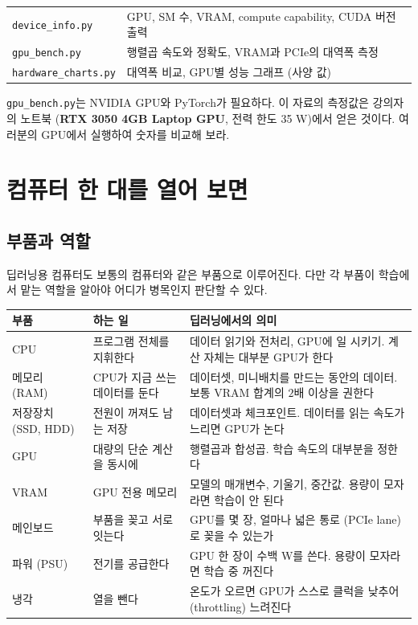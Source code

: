 \documentclass[11pt,a4paper]{article}
\begin{document}
\begin{remarkbox}
\begin{tabular}{@{}ll@{}}
\texttt{device\_info.py} & GPU, SM 수, VRAM, compute capability, CUDA 버전 출력 \\
\texttt{gpu\_bench.py} & 행렬곱 속도와 정확도, VRAM과 PCIe의 대역폭 측정 \\
\texttt{hardware\_charts.py} & 대역폭 비교, GPU별 성능 그래프 (사양 값) \\
\end{tabular}
\medskip

\texttt{gpu\_bench.py}는 NVIDIA GPU와 PyTorch가 필요하다.
이 자료의 측정값은 강의자의 노트북 (\textbf{RTX 3050 4GB Laptop GPU}, 전력 한도 35 W)에서 얻은 것이다.
여러분의 GPU에서 실행하여 숫자를 비교해 보라.
\end{remarkbox}

\section{컴퓨터 한 대를 열어 보면}\label{sec:parts}

\subsection{부품과 역할}\label{sec:parts_roles}

딥러닝용 컴퓨터도 보통의 컴퓨터와 같은 부품으로 이루어진다. 다만 각 부품이 학습에서 맡는 역할을 알아야 어디가 병목인지 판단할 수 있다.

\begin{center}
{\small
\begin{tabular}{@{}>{\raggedright\arraybackslash}p{30mm}>{\raggedright\arraybackslash}p{52mm}>{\raggedright\arraybackslash}p{68mm}@{}}
\toprule
부품 & 하는 일 & 딥러닝에서의 의미 \\
\midrule
CPU & 프로그램 전체를 지휘한다 & 데이터 읽기와 전처리, GPU에 일 시키기. 계산 자체는 대부분 GPU가 한다 \\
메모리 (RAM) & CPU가 지금 쓰는 데이터를 둔다 & 데이터셋, 미니배치를 만드는 동안의 데이터. 보통 VRAM 합계의 $2$배 이상을 권한다 \\
저장장치 (SSD, HDD) & 전원이 꺼져도 남는 저장 & 데이터셋과 체크포인트. 데이터를 읽는 속도가 느리면 GPU가 논다 \\
GPU & 대량의 단순 계산을 동시에 & 행렬곱과 합성곱. 학습 속도의 대부분을 정한다 \\
VRAM & GPU 전용 메모리 & 모델의 매개변수, 기울기, 중간값. 용량이 모자라면 학습이 안 된다 \\
메인보드 & 부품을 꽂고 서로 잇는다 & GPU를 몇 장, 얼마나 넓은 통로 (PCIe lane)로 꽂을 수 있는가 \\
파워 (PSU) & 전기를 공급한다 & GPU 한 장이 수백 W를 쓴다. 용량이 모자라면 학습 중 꺼진다 \\
냉각 & 열을 뺀다 & 온도가 오르면 GPU가 스스로 클럭을 낮추어 (throttling) 느려진다 \\
\bottomrule
\end{tabular}}
\end{center}
\end{document}
